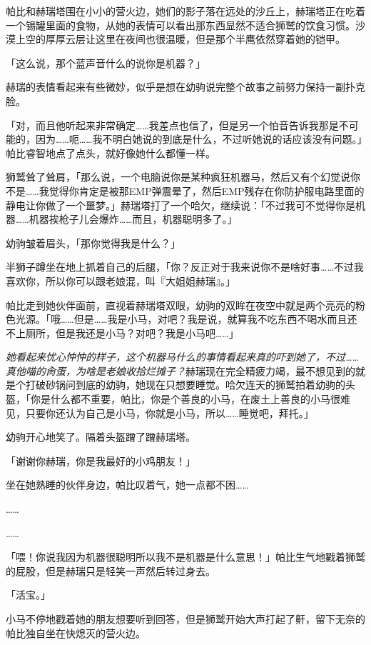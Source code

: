 \horizonline


帕比和赫瑞塔围在小小的营火边，她们的影子落在远处的沙丘上，赫瑞塔正在吃着一个锡罐里面的食物，从她的表情可以看出那东西显然不适合狮鹫的饮食习惯。沙漠上空的厚厚云层让这里在夜间也很温暖，但是那个半鹰依然穿着她的铠甲。

「这么说，那个蓝声音什么的说你是机器？」

赫瑞的表情看起来有些微妙，似乎是想在幼驹说完整个故事之前努力保持一副扑克脸。

「对，而且他听起来非常确定……我差点也信了，但是另一个怕音告诉我那是不可能的，因为……呃……我不明白她说的到底是什么，不过听她说的话应该没有问题。」帕比睿智地点了点头，就好像她什么都懂一样。

狮鹫耸了耸肩，「那么说，一个电脑说你是某种疯狂机器马，然后又有个幻觉说你不是……我觉得你肯定是被那EMP弹震晕了，然后EMP残存在你防护服电路里面的静电让你做了一个噩梦。」赫瑞塔打了一个哈欠，继续说：「不过我可不觉得你是机器……机器挨枪子儿会爆炸……而且，机器聪明多了。」

幼驹皱着眉头，「那你觉得我是什么？」

半狮子蹲坐在地上抓着自己的后腿，「你？反正对于我来说你不是啥好事……不过我喜欢你，所以你可以跟老娘混，叫『大姐姐赫瑞』。」

帕比走到她伙伴面前，直视着赫瑞塔双眼，幼驹的双眸在夜空中就是两个亮亮的粉色光源。「哦……但是……我是小马，对吧？我是说，就算我不吃东西不喝水而且还不上厕所，但是我还是小马？对吧？我是小马吧……」

\emph{她看起来忧心忡忡的样子，这个机器马什么的事情看起来真的吓到她了，不过……真他喵的肏蛋，为啥是老娘收拾烂摊子？}赫瑞现在完全精疲力竭，最不想见到的就是个打破砂锅问到底的幼驹，她现在只想要睡觉。哈欠连天的狮鹫拍着幼驹的头盔，「你是什么都不重要，帕比，你是个善良的小马，在废土上善良的小马很难见，只要你还认为自己是小马，你就是小马，所以……睡觉吧，拜托。」

幼驹开心地笑了。隔着头盔蹭了蹭赫瑞塔。

「谢谢你赫瑞，你是我最好的小鸡朋友！」

坐在她熟睡的伙伴身边，帕比叹着气，她一点都不困……

……

……

「喂！你说我因为机器很聪明所以我不是机器是什么意思！」帕比生气地戳着狮鹫的屁股，但是赫瑞只是轻笑一声然后转过身去。

「活宝。」

小马不停地戳着她的朋友想要听到回答，但是狮鹫开始大声打起了鼾，留下无奈的帕比独自坐在快熄灭的营火边。

